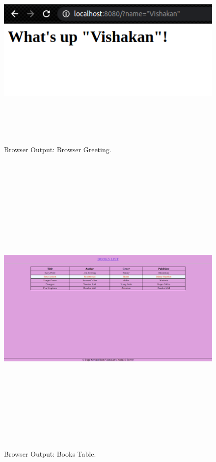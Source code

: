 \documentclass[12pt, a4]{article}
\begin{document}
\subsection*{}
\begin{figure}[h]
\centering
\caption{Browser Output: Browser Greeting.}
\includegraphics[height=10cm, width=18cm, keepaspectratio]{Output/BrowserGreetingOP.png}
\end{figure}

\newpage
\subsection*{}
\begin{figure}[h]
\centering
\caption{Browser Output: Books Table.}
\includegraphics[height=15cm, width=18cm]{Output/BooksOP.png}
\end{figure}
\end{document}
